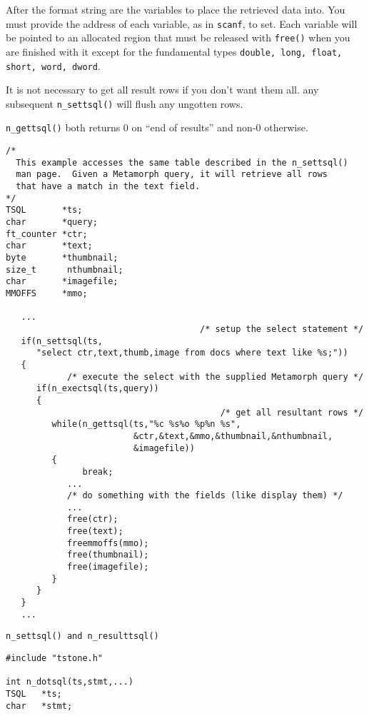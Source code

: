 After the format string are the variables to place the retrieved data
into.  You must provide the address of each variable, as in
\verb`scanf`, to set.  Each variable will be pointed to an allocated
region that must be released with \verb`free()` when you are finished
with it except for the fundamental types
\verb`double, long, float, short, word, dword`.

It is not necessary to get all result rows if you don't want them all.
any subsequent \verb`n_settsql()` will flush any ungotten rows.

\verb`n_gettsql()` both returns 0 on ``end of results'' and non-0 otherwise.

\EXAMPLE
\begin{verbatim}
/*
  This example accesses the same table described in the n_settsql()
  man page.  Given a Metamorph query, it will retrieve all rows
  that have a match in the text field.
*/
TSQL       *ts;
char       *query;
ft_counter *ctr;
char       *text;
byte       *thumbnail;
size_t      nthumbnail;
char       *imagefile;
MMOFFS     *mmo;

   ...
                                      /* setup the select statement */
   if(n_settsql(ts,
      "select ctr,text,thumb,image from docs where text like %s;"))
   {
            /* execute the select with the supplied Metamorph query */
      if(n_exectsql(ts,query))
      {
                                          /* get all resultant rows */
         while(n_gettsql(ts,"%c %s%o %p%n %s",
                         &ctr,&text,&mmo,&thumbnail,&nthumbnail,
                         &imagefile))
         {
               break;
            ...
            /* do something with the fields (like display them) */
            ...
            free(ctr);
            free(text);
            freemmoffs(mmo);
            free(thumbnail);
            free(imagefile);
         }
      }
   }
   ...
\end{verbatim}

\SEE
\begin{verbatim}
n_settsql() and n_resulttsql()
\end{verbatim}


\SYNOPSIS
\begin{verbatim}
#include "tstone.h"

int n_dotsql(ts,stmt,...)
TSQL   *ts;
char   *stmt;
\end{verbatim}

